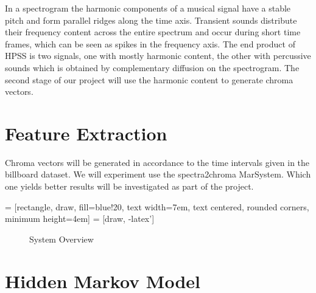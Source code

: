 \documentclass{article}
\begin{document}
In a spectrogram the harmonic components of a musical signal have a stable
pitch and form parallel ridges along the time axis. Transient sounds distribute
their frequency content across the entire spectrum and occur during short time
frames, which can be seen as spikes in the frequency axis. The end product of
HPSS is two signals, one with mostly harmonic content, the other with
percussive sounds which is obtained by complementary diffusion on the
spectrogram. The second stage of our project will use the harmonic content to
generate chroma vectors.

\section{Feature Extraction}

Chroma vectors will be generated in accordance to the time intervals given in
the billboard dataset.  We will experiment use the spectra2chroma MarSystem.
Which one yields better results will be investigated as part of the project.

 = [rectangle, draw, fill=blue!20,
    text width=7em, text centered, rounded corners, minimum height=4em]
 = [draw, -latex']

\begin{figure}
\caption{System Overview}
\end{figure}

\section{Hidden Markov Model}
\end{document}
